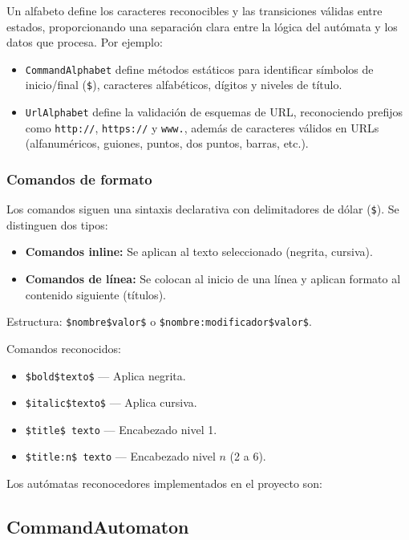\documentclass[12pt,letterpaper]{article}
\begin{document}
Un alfabeto define los caracteres reconocibles y las transiciones válidas entre estados, proporcionando una separación clara entre la lógica del autómata y los datos que procesa. Por ejemplo:

\begin{itemize}
    \item \texttt{CommandAlphabet} define métodos estáticos para identificar símbolos de inicio/final (\texttt{\$}), caracteres alfabéticos, dígitos y niveles de título.
    \item \texttt{UrlAlphabet} define la validación de esquemas de URL, reconociendo prefijos como \texttt{http://}, \texttt{https://} y \texttt{www.}, además de caracteres válidos en URLs (alfanuméricos, guiones, puntos, dos puntos, barras, etc.).
\end{itemize}

\subsubsection{Comandos de formato}
Los comandos siguen una sintaxis declarativa con delimitadores de dólar (\texttt{\$}). Se distinguen dos tipos:

\begin{itemize}
    \item \textbf{Comandos inline:} Se aplican al texto seleccionado (negrita, cursiva).
    \item \textbf{Comandos de línea:} Se colocan al inicio de una línea y aplican formato al contenido siguiente (títulos).
\end{itemize}

Estructura: \texttt{\$nombre\$valor\$} o \texttt{\$nombre:modificador\$valor\$}.

Comandos reconocidos:

\begin{itemize}
    \item \texttt{\$bold\$texto\$} — Aplica negrita.
    \item \texttt{\$italic\$texto\$} — Aplica cursiva.
    \item \texttt{\$title\$ texto} — Encabezado nivel 1.
    \item \texttt{\$title:n\$ texto} — Encabezado nivel $n$ (2 a 6).
\end{itemize}

Los autómatas reconocedores implementados en el proyecto son:

\subsection{CommandAutomaton}
\end{document}
